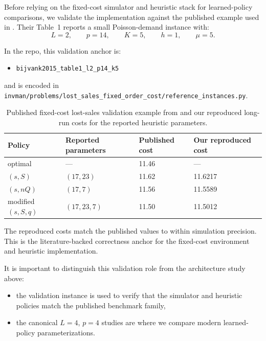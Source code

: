 \documentclass[11pt]{article}
\begin{document}
Before relying on the fixed-cost simulator and heuristic stack for learned-policy comparisons, we
validate the implementation against the published example used in
\citet{Bijvank2015ParametricPolicies}. Their Table~1 reports a small Poisson-demand instance with:
\[
L=2,\qquad p=14,\qquad K=5,\qquad h=1,\qquad \mu=5.
\]

In the repo, this validation anchor is:
\begin{itemize}
    \item \texttt{bijvank2015\_table1\_l2\_p14\_k5}
\end{itemize}
and is encoded in
\texttt{invman/problems/lost\_sales\_fixed\_order\_cost/reference\_instances.py}.

\begin{table}[t]
\centering
\caption{Published fixed-cost lost-sales validation example from
\citet{Bijvank2015ParametricPolicies} and our reproduced long-run costs for the reported heuristic
parameters.}
\label{tab:fixed-cost-validation}
\begin{tabular}{llll}
\toprule
Policy & Reported parameters & Published cost & Our reproduced cost \\
\midrule
optimal & --- & 11.46 & --- \\
$(s,S)$ & $(17,23)$ & 11.62 & 11.6217 \\
$(s,nQ)$ & $(17,7)$ & 11.56 & 11.5589 \\
modified $(s,S,q)$ & $(17,23,7)$ & 11.50 & 11.5012 \\
\bottomrule
\end{tabular}
\end{table}

The reproduced costs match the published values to within simulation precision. This is the
literature-backed correctness anchor for the fixed-cost environment and heuristic implementation.

It is important to distinguish this validation role from the architecture study above:
\begin{itemize}
    \item the validation instance is used to verify that the simulator and heuristic policies match
    the published benchmark family,
    \item the canonical $L=4$, $p=4$ studies are where we compare modern learned-policy
    parameterizations.
\end{itemize}



\end{document}

